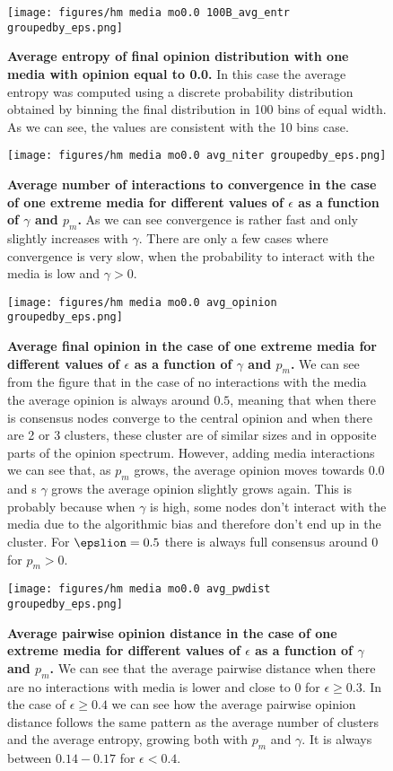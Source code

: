 \documentclass[10pt,letterpaper]{article}
\begin{document}
\begin{figure}
    \centering
    \texttt{[image: figures/hm media mo0.0 100B\_avg\_entr groupedby\_eps.png]}
    \caption{\textbf{Average entropy of final opinion distribution with one media with opinion equal to 0.0.} In this case the average entropy was computed using a discrete probability distribution obtained by binning the final distribution in 100 bins of equal width. As we can see, the values are consistent with the 10 bins case.}
    \label{fig:00avg100Bentrbyeps}
\end{figure}

\begin{figure}
    \centering
    \texttt{[image: figures/hm media mo0.0 avg\_niter groupedby\_eps.png]}
    \caption{\textbf{Average number of interactions to convergence in the case of one extreme media for different values of $\epsilon$ as a function of $\gamma$ and $p_m$.} As we can see convergence is rather fast and only slightly increases with $\gamma$. There are only a few cases where convergence is very slow, when the probability to interact with the media is low and $\gamma > 0$. }
    \label{fig:00avgniterbyeps}
\end{figure}

\begin{figure}
    \centering
    \texttt{[image: figures/hm media mo0.0 avg\_opinion groupedby\_eps.png]}
    \caption{\textbf{Average final opinion in the case of one extreme media for different values of $\epsilon$ as a function of $\gamma$ and $p_m$.} We can see from the figure that in the case of no interactions with the media the average opinion is always around $0.5$, meaning that when there is consensus nodes converge to the central opinion and when there are 2 or 3 clusters, these cluster are of similar sizes and in opposite parts of the opinion spectrum. However, adding media interactions we can see that, as $p_m$ grows, the average opinion moves towards $0.0$ and s $\gamma$ grows the average opinion slightly grows again. This is probably because when $\gamma$ is high, some nodes don't interact with the media due to the algorithmic bias and therefore don't end up in the  cluster. For $\epslion = 0.5$ there is always full consensus around $0$ for $p_m > 0$.}
    \label{fig:00avgopinionbyeps}
\end{figure}

\begin{figure}
    \centering
    \texttt{[image: figures/hm media mo0.0 avg\_pwdist groupedby\_eps.png]}
    \caption{\textbf{Average pairwise opinion distance in the case of one extreme media for different values of $\epsilon$ as a function of $\gamma$ and $p_m$.} We can see that the average pairwise distance when there are no interactions with media is lower and close to $0$ for $\epsilon \geq 0.3$. In the case of $\epsilon \geq 0.4$ we can see how the average pairwise opinion distance follows the same pattern as the average number of clusters and the average entropy, growing both with $p_m$ and $\gamma$. It is always between $0.14-0.17$ for $\epsilon < 0.4$.}
    \label{fig:00avgpwdistbyeps}
\end{figure}
\end{document}
